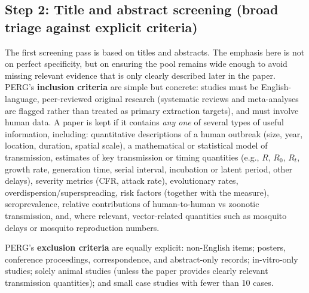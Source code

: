 
\subsection*{Step 2: Title and abstract screening (broad triage against explicit criteria)}
The first screening pass is based on titles and abstracts. The emphasis here is not on perfect specificity, but on ensuring the pool remains wide enough to avoid missing relevant evidence that is only clearly described later in the paper. PERG’s \textbf{inclusion criteria} are simple but concrete: studies must be English-language, peer-reviewed original research (systematic reviews and meta-analyses are flagged rather than treated as primary extraction targets), and must involve human data. A paper is kept if it contains \emph{any one} of several types of useful information, including: quantitative descriptions of a human outbreak (size, year, location, duration, spatial scale), a mathematical or statistical model of transmission, estimates of key transmission or timing quantities (e.g., $R$, $R_0$, $R_t$, growth rate, generation time, serial interval, incubation or latent period, other delays), severity metrics (CFR, attack rate), evolutionary rates, overdispersion/superspreading, risk factors (together with the measure), seroprevalence, relative contributions of human-to-human vs zoonotic transmission, and, where relevant, vector-related quantities such as mosquito delays or mosquito reproduction numbers.

PERG’s \textbf{exclusion criteria} are equally explicit: non-English items; posters, conference proceedings, correspondence, and abstract-only records; in-vitro-only studies; solely animal studies (unless the paper provides clearly relevant transmission quantities); and small case studies with fewer than 10 cases.

